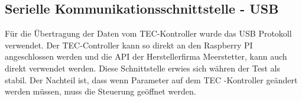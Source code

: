 
\subsection{Serielle Kommunikationsschnittstelle - USB}
Für die Übertragung der Daten vom TEC-Kontroller wurde das USB Protokoll verwendet. Der TEC-Controller kann so direkt an den Raspberry PI angeschlossen werden und die API der Herstellerfirma Meerstetter, kann auch direkt verwendet werden. Diese Schnittstelle erwies sich währen der Test als stabil. Der Nachteil ist, dass wenn Parameter auf dem TEC -Kontroller geändert werden müssen, muss die Steuerung geöffnet werden.

\nocite{*}